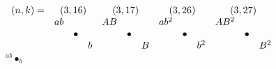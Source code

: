 \documentclass{article}
\begin{document}
\(
\begin{array}{crclrclrclrcl}
  (n,k)= & \multicolumn{3}{c}{(3,16)} & \multicolumn{3}{c}{(3,17)} & \multicolumn{3}{c}{(3,26)} & \multicolumn{3}{c}{(3,27)} \\
  & ab & & & AB & & & ab^2 & & & AB^2 & & \\
  & & \bullet & & & \bullet & & & \bullet & & & \bullet & \\
  & & & b & & & B & & & b^2& & & B^2 
\end{array}
\)\\
\(
{}^{ab}\bullet_{b}
\)
\end{document}
